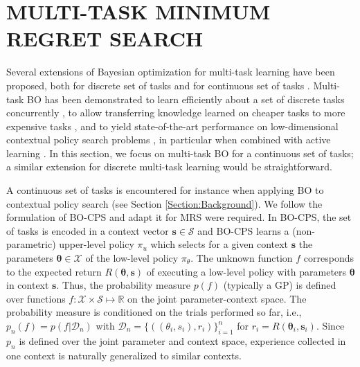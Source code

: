 \documentclass[10pt,letterpaper]{article} %
\begin{document}
\section{MULTI-TASK MINIMUM REGRET SEARCH} \label{Section:CMRS}


Several extensions of Bayesian optimization for multi-task learning have been
proposed, both for discrete set of tasks \citep{krause_contextual_2011}
and for continuous set of tasks
\cite{metzen_active_2015}. Multi-task BO has been demonstrated to learn
efficiently about a set of discrete tasks concurrently
\cite{krause_contextual_2011}, to allow transferring knowledge learned on
cheaper tasks to more expensive tasks \cite{swersky_multi-task_2013}, and to
yield state-of-the-art performance on low-dimensional contextual policy search
problems \cite{metzen_bayesian_2015}, in particular when combined with active
learning \cite{metzen_active_2015}. In this section, we focus on multi-task BO
for a continuous set of tasks; a similar extension for discrete multi-task
learning would be straightforward.

A continuous set of tasks is encountered for instance when applying BO to
contextual policy search (see Section \ref{Section:Background}). We follow the
formulation of BO-CPS \cite{metzen_bayesian_2015} and adapt it for MRS were
required. In BO-CPS, the set of tasks is encoded in a context vector $\mathbf{s}
\in \mathcal{S}$ and BO-CPS learns a (non-parametric) upper-level policy $\pi_{u}$
which selects for a given context $\mathbf{s}$ the parameters $\mathbf{\theta}
\in \mathcal{X}$ of the low-level policy $\pi_\theta$. The unknown function $f$
corresponds to the expected return $R(\mathbf{\theta}, \mathbf{s})$ of executing
a low-level policy with parameters $\mathbf{\theta}$ in context $\mathbf{s}$.
Thus, the probability measure $p(f)$ (typically a GP) is defined over functions
$f: \mathcal{X} \times \mathcal{S} \mapsto \mathbb{R}$ on the joint
parameter-context space. The probability measure is conditioned on the trials performed so
far, i.e., $p_n(f) = p(f \vert \mathcal{D}_n)$ with $\mathcal{D}_n =
\{((\theta_i, s_i), r_i)\}_{i=1}^n$ for $r_i = R(\mathbf{\theta}_i, \mathbf{s}_i)$. Since $p_n$ is defined over the joint
parameter and context space, experience collected in one context is naturally
generalized to similar contexts. 
\end{document}
